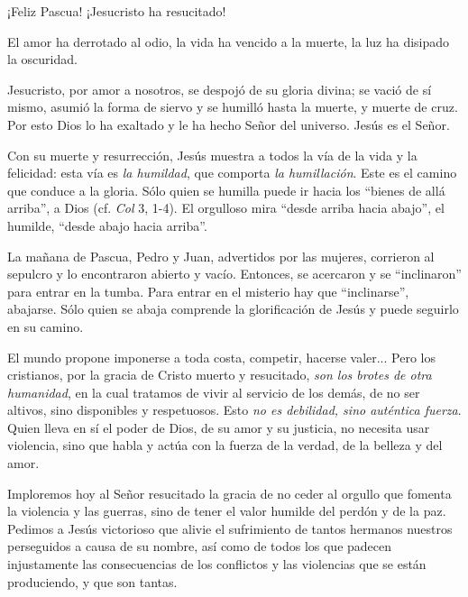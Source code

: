 			\begin{body}¡Feliz Pascua! ¡Jesucristo ha resucitado!\end{body}
			
			\begin{body}El amor ha derrotado al odio, la vida ha vencido a la muerte, la luz ha disipado la oscuridad.\end{body}
			
			\begin{body}Jesucristo, por amor a nosotros, se despojó de su gloria divina; se vació de sí mismo, asumió la forma de siervo y se humilló hasta la muerte, y muerte de cruz. Por esto Dios lo ha exaltado y le ha hecho Señor del universo. Jesús es el Señor.\end{body}
			
			\begin{body}Con su muerte y resurrección, Jesús muestra a todos la vía de la vida y la felicidad: esta vía es \textit{la humildad}, que comporta \textit{la humillación}. Este es el camino que conduce a la gloria. Sólo quien se humilla puede ir hacia los “bienes de allá arriba”, a Dios (cf. \textit{Col} 3, 1-4). El orgulloso mira “desde arriba hacia abajo”, el humilde, “desde abajo hacia arriba”.\end{body}
			
			\begin{body}La mañana de Pascua, Pedro y Juan, advertidos por las mujeres, corrieron al sepulcro y lo encontraron abierto y vacío. Entonces, se acercaron y se “inclinaron” para entrar en la tumba. Para entrar en el misterio hay que “inclinarse”, abajarse. Sólo quien se abaja comprende la glorificación de Jesús y puede seguirlo en su camino.\end{body}
			
			\begin{body}El mundo propone imponerse a toda costa, competir, hacerse valer... Pero los cristianos, por la gracia de Cristo muerto y resucitado, \textit{son los brotes de otra humanidad}, en la cual tratamos de vivir al servicio de los demás, de no ser altivos, sino disponibles y respetuosos. Esto \textit{no es debilidad, sino auténtica fuerza}. Quien lleva en sí el poder de Dios, de su amor y su justicia, no necesita usar violencia, sino que habla y actúa con la fuerza de la verdad, de la belleza y del amor.\end{body}
			
			\begin{body}Imploremos hoy al Señor resucitado la gracia de no ceder al orgullo que fomenta la violencia y las guerras, sino de tener el valor humilde del perdón y de la paz. Pedimos a Jesús victorioso que alivie el sufrimiento de tantos hermanos nuestros perseguidos a causa de su nombre, así como de todos los que padecen injustamente las consecuencias de los conflictos y las violencias que se están produciendo, y que son tantas.\end{body}
			
